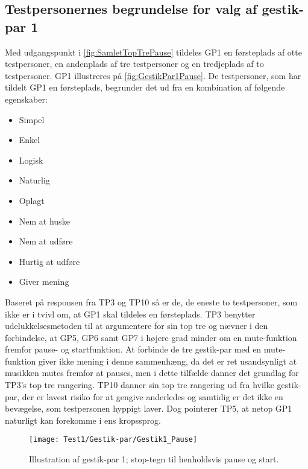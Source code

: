 \subsection{Testpersonernes begrundelse for valg af gestik-par 1}
\label{TestresultaterValgAfGestikkerBegrundelseGP1Pause}
%
Med udgangspunkt i \autoref{fig:SamletTopTrePause} tildeles GP1 en førsteplads af otte testpersoner, en andenplads af tre testpersoner og en tredjeplads af to testpersoner. GP1 illustreres på \autoref{fig:GestikPar1Pause}. De testpersoner, som har tildelt GP1 en førsteplads, begrunder det ud fra en kombination af følgende egenskaber: 
%
\begin{multicols}{3}
    \begin{itemize}
        \item Simpel
        \item Enkel
        \item Logisk
        \item Naturlig
        \item Oplagt
        \item Nem at huske
        \item Nem at udføre
        \item Hurtig at udføre
        \item Giver mening
\end{itemize}
\end{multicols}
\noindent
%
Baseret på responsen fra TP3 og TP10 så er de, de eneste to testpersoner, som ikke er i tvivl om, at GP1 skal tildeles en førsteplads. TP3 benytter udelukkelsesmetoden til at argumentere for sin top tre og nævner i den forbindelse, at GP5, GP6 samt GP7 i højere grad minder om en mute-funktion fremfor pause- og startfunktion. At forbinde de tre gestik-par med en mute-funktion giver ikke mening i denne sammenhæng, da det er ret usandsynligt at musikken mutes fremfor at pauses, men i dette tilfælde danner det grundlag for TP3's top tre rangering. TP10 danner sin top tre rangering ud fra hvilke gestik-par, der er lavest risiko for at gengive anderledes og samtidig er det ikke en bevægelse, som testpersonen hyppigt laver. Dog pointerer TP5, at netop GP1 naturligt kan forekomme i ens kropssprog.
%
\begin{figure}[H]
	\centering
	\texttt{[image: Test1/Gestik-par/Gestik1\_Pause]}
	\caption{Illustration af gestik-par 1; stop-tegn til henholdsvis pause og start.}
	\label{fig:GestikPar1Pause}
\end{figure}
\noindent
%
